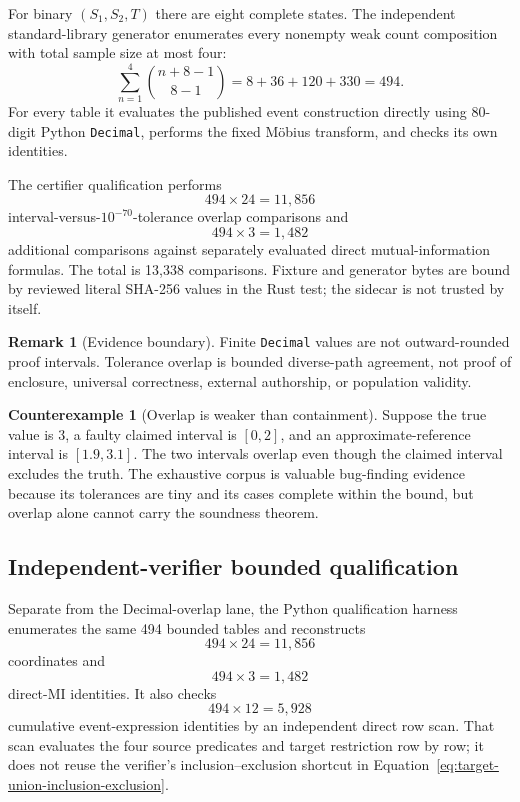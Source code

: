 \documentclass[11pt]{article}
\theoremstyle{definition}
\newtheorem{remark}[theorem]{Remark}
\newtheorem{counterexample}[theorem]{Counterexample}
\begin{document}
For binary $(S_1,S_2,T)$ there are eight complete states.  The independent standard-library
generator enumerates every nonempty weak count composition with total sample size at most four:
\begin{equation}
  \sum_{n=1}^{4}\binom{n+8-1}{8-1}
  =8+36+120+330
  =494.
\end{equation}
For every table it evaluates the published event construction directly using 80-digit Python
\texttt{Decimal}, performs the fixed M{\"o}bius transform, and checks its own identities.

The certifier qualification performs
\begin{equation}
  494\times24=11{,}856
\end{equation}
interval-versus-$10^{-70}$-tolerance overlap comparisons and
\begin{equation}
  494\times3=1{,}482
\end{equation}
additional comparisons against separately evaluated direct mutual-information formulas.  The
total is 13,338 comparisons.  Fixture and generator bytes are bound by reviewed literal SHA-256
values in the Rust test; the sidecar is not trusted by itself.

\begin{remark}[Evidence boundary]
Finite \texttt{Decimal} values are not outward-rounded proof intervals.  Tolerance overlap is
bounded diverse-path agreement, not proof of enclosure, universal correctness, external
authorship, or population validity.
\end{remark}

\begin{counterexample}[Overlap is weaker than containment]
Suppose the true value is $3$, a faulty claimed interval is $[0,2]$, and an approximate-reference
interval is $[1.9,3.1]$.  The two intervals overlap even though the claimed interval excludes the
truth.  The exhaustive corpus is valuable bug-finding evidence because its tolerances are tiny
and its cases complete within the bound, but overlap alone cannot carry the soundness theorem.
\end{counterexample}

\subsection{Independent-verifier bounded qualification}

Separate from the Decimal-overlap lane, the Python qualification harness enumerates the same 494
bounded tables and reconstructs
\[
  494\times24=11{,}856
\]
coordinates and
\[
  494\times3=1{,}482
\]
direct-MI identities.  It also checks
\[
  494\times12=5{,}928
\]
cumulative event-expression identities by an independent direct row scan.  That scan evaluates
the four source predicates and target restriction row by row; it does not reuse the verifier's
inclusion--exclusion shortcut in Equation~\eqref{eq:target-union-inclusion-exclusion}.
\end{document}
